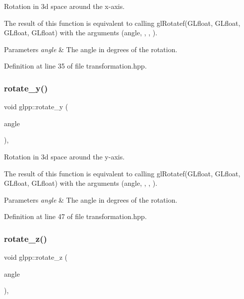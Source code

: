 Rotation in 3d space around the x-\/axis. 

The result of this function is equivalent to calling gl\+Rotatef(\+G\+Lfloat, G\+Lfloat, G\+Lfloat, G\+Lfloat) with the arguments ({\ttfamily angle}, {}, {}, {}).


\begin{DoxyParams}{Parameters}
{\em angle} & The angle in degrees of the rotation. \\
\hline
\end{DoxyParams}


Definition at line 35 of file transformation.\+hpp.

\mbox{\label{namespaceglpp_a730d2b64f2390ffef365de9b281a1e7f}} 
\subsubsection{\texorpdfstring{rotate\+\_\+y()}{rotate\_y()}}
{\footnotesize\ttfamily void glpp\+::rotate\+\_\+y (\begin{DoxyParamCaption}\item[{register const G\+Lfloat}]{angle }\end{DoxyParamCaption})\hspace{0.3cm}{\ttfamily [inline]}, {\ttfamily [noexcept]}}



Rotation in 3d space around the y-\/axis. 

The result of this function is equivalent to calling gl\+Rotatef(\+G\+Lfloat, G\+Lfloat, G\+Lfloat, G\+Lfloat) with the arguments ({\ttfamily angle}, {}, {}, {}).


\begin{DoxyParams}{Parameters}
{\em angle} & The angle in degrees of the rotation. \\
\hline
\end{DoxyParams}


Definition at line 47 of file transformation.\+hpp.

\mbox{\label{namespaceglpp_a9c36888e2f7b0c830ec129188ac528d1}} 
\subsubsection{\texorpdfstring{rotate\+\_\+z()}{rotate\_z()}}
{\footnotesize\ttfamily void glpp\+::rotate\+\_\+z (\begin{DoxyParamCaption}\item[{register const G\+Lfloat}]{angle }\end{DoxyParamCaption})\hspace{0.3cm}{\ttfamily [inline]}, {\ttfamily [noexcept]}}



